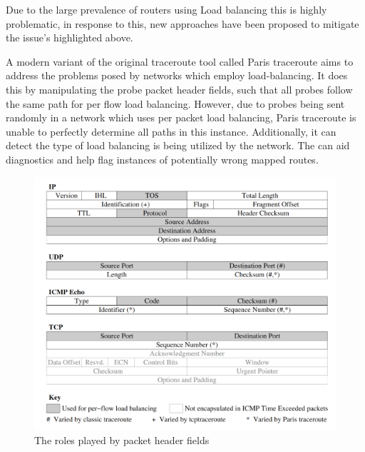 
Due to the large prevalence of routers using Load balancing this is highly problematic, in response to this, new approaches have been proposed to mitigate the issue's highlighted above.


A modern variant of the original traceroute tool called Paris traceroute aims to address the problems posed by networks which employ load-balancing. It does this by manipulating the probe packet header fields, such that all probes follow the same path for per flow load balancing. However, due to probes being sent randomly in a network which uses per packet load balancing, Paris traceroute is unable to perfectly determine all paths in this instance. 
Additionally, it can detect the type of load balancing is being utilized by the network. The can aid diagnostics and help flag instances of potentially wrong mapped routes. \cite{anomalies}

\begin{figure}[!ht]
  \begin{center}
    \includegraphics[scale=0.3]{images/packet_header.png}
    \caption{The roles played by packet header fields \cite{anomalies}}
    \label{figure:packet_header_fig}
  \end{center}
\end{figure}


